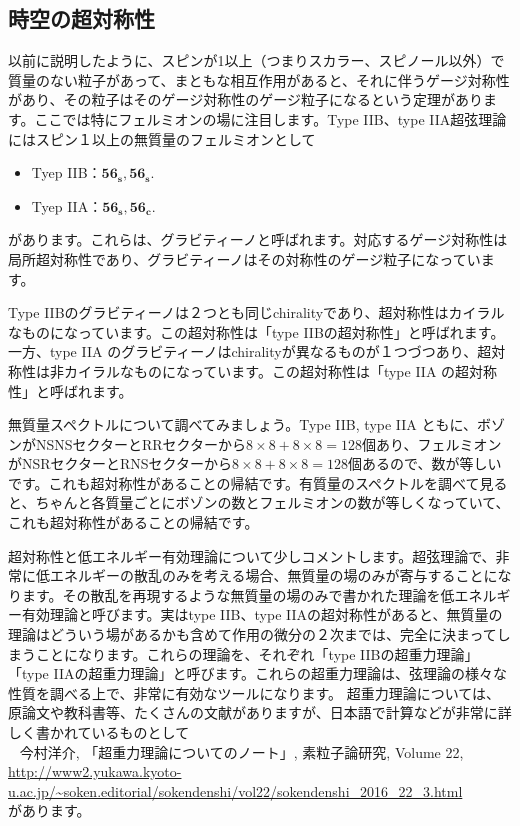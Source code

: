 \documentclass[report,paper=a4, fontsize=12pt, line_length=16cm, number_of_lines=34,dvipdfmx]{jlreq}
\newenvironment{mycite}{\\ \qquad \textbullet\ }{\\}
\numberwithin{equation}{chapter}
\numberwithin{equation}{section}
\newcommand{\fsxs}{\mathbf{56_s}}
\newcommand{\fsxc}{\mathbf{56_c}}
\begin{document}
\subsection{時空の超対称性}
以前に説明したように、スピンが1以上（つまりスカラー、スピノール以外）で質量のない粒子があって、まともな相互作用があると、それに伴うゲージ対称性があり、その粒子はそのゲージ対称性のゲージ粒子になるという定理があります。ここでは特にフェルミオンの場に注目します。Type IIB、type IIA超弦理論にはスピン１以上の無質量のフェルミオンとして
\begin{itemize}
  \item Tyep IIB：$\fsxs,\fsxs$.
  \item Tyep IIA：$\fsxs,\fsxc$.
\end{itemize}
があります。これらは、グラビティーノと呼ばれます。対応するゲージ対称性は局所超対称性であり、グラビティーノはその対称性のゲージ粒子になっています。

Type IIBのグラビティーノは２つとも同じchiralityであり、超対称性はカイラルなものになっています。この超対称性は「type IIBの超対称性」と呼ばれます。一方、type IIA のグラビティーノはchiralityが異なるものが１つづつあり、超対称性は非カイラルなものになっています。この超対称性は「type IIA の超対称性」と呼ばれます。

無質量スペクトルについて調べてみましょう。Type IIB, type IIA ともに、ボゾンがNSNSセクターとRRセクターから$8\times 8+8\times 8=128$個あり、フェルミオンがNSRセクターとRNSセクターから$8\times 8+8\times 8=128$個あるので、数が等しいです。これも超対称性があることの帰結です。有質量のスペクトルを調べて見ると、ちゃんと各質量ごとにボゾンの数とフェルミオンの数が等しくなっていて、これも超対称性があることの帰結です。

超対称性と低エネルギー有効理論について少しコメントします。超弦理論で、非常に低エネルギーの散乱のみを考える場合、無質量の場のみが寄与することになります。その散乱を再現するような無質量の場のみで書かれた理論を低エネルギー有効理論と呼びます。実はtype IIB、type IIAの超対称性があると、無質量の理論はどういう場があるかも含めて作用の微分の２次までは、完全に決まってしまうことになります。これらの理論を、それぞれ「type IIBの超重力理論」「type IIAの超重力理論」と呼びます。これらの超重力理論は、弦理論の様々な性質を調べる上で、非常に有効なツールになります。
超重力理論については、原論文や教科書等、たくさんの文献がありますが、日本語で計算などが非常に詳しく書かれているものとして
\begin{mycite}
  今村洋介, 「超重力理論についてのノート」, 素粒子論研究, Volume 22, \url{http://www2.yukawa.kyoto-u.ac.jp/~soken.editorial/sokendenshi/vol22/sokendenshi_2016_22_3.html}
\end{mycite}
があります。
\end{document}
